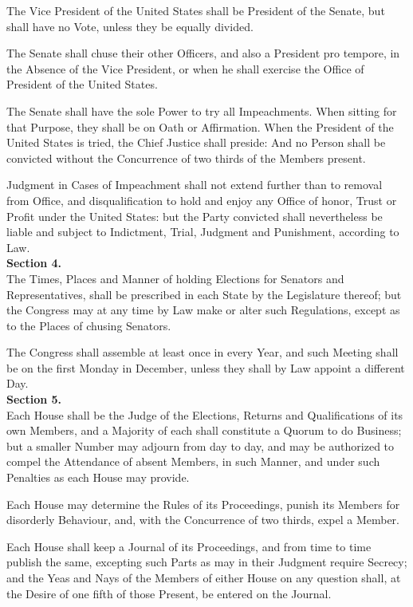 The Vice President of the United States shall be President of the Senate, but shall have no Vote, unless they be equally divided.

The Senate shall chuse their other Officers, and also a President pro tempore, in the Absence of the Vice President, or when he shall exercise the Office of President of the United States.

The Senate shall have the sole Power to try all Impeachments. When sitting for that Purpose, they shall be on Oath or Affirmation. When the President of the United States is tried, the Chief Justice shall preside: And no Person shall be convicted without the Concurrence of two thirds of the Members present.

Judgment in Cases of Impeachment shall not extend further than to removal from Office, and disqualification to hold and enjoy any Office of honor, Trust or Profit under the United States: but the Party convicted shall nevertheless be liable and subject to Indictment, Trial, Judgment and Punishment, according to Law.\\[0.01in]

{\large \textbf{Section 4.}}\\[0.01in]

The Times, Places and Manner of holding Elections for Senators and Representatives, shall be prescribed in each State by the Legislature thereof; but the Congress may at any time by Law make or alter such Regulations, except as to the Places of chusing Senators.

The Congress shall assemble at least once in every Year, and such Meeting shall be on the first Monday in December, unless they shall by Law appoint a different Day.\\[0.01in]

{\large \textbf{Section 5.}}\\[0.01in]

Each House shall be the Judge of the Elections, Returns and Qualifications of its own Members, and a Majority of each shall constitute a Quorum to do Business; but a smaller Number may adjourn from day to day, and may be authorized to compel the Attendance of absent Members, in such Manner, and under such Penalties as each House may provide.

Each House may determine the Rules of its Proceedings, punish its Members for disorderly Behaviour, and, with the Concurrence of two thirds, expel a Member.

Each House shall keep a Journal of its Proceedings, and from time to time publish the same, excepting such Parts as may in their Judgment require Secrecy; and the Yeas and Nays of the Members of either House on any question shall, at the Desire of one fifth of those Present, be entered on the Journal.

